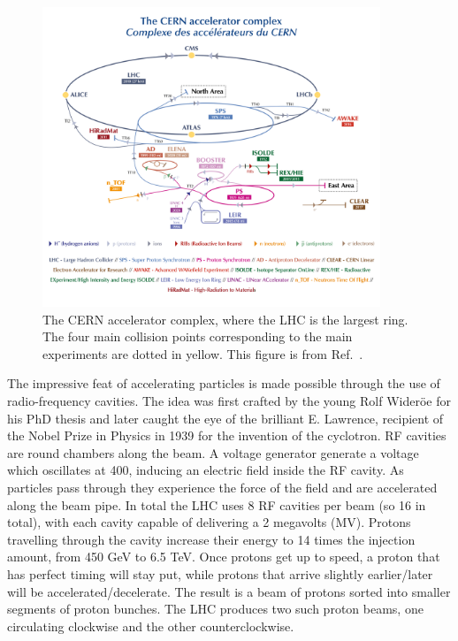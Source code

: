 \begin{figure}
  \includegraphics[width=0.9\textwidth]{Figures/LHC/CernAcceleratorComplex.png}
  \caption[The \CERN accelerator complex]%
  {The CERN accelerator complex, where the LHC is the largest ring. The four main collision points corresponding to the main experiments are dotted in yellow. This figure is from Ref.~\cite{Mobs:2684277}.}
  \label{fig:CERNComplex}
\end{figure}

The impressive feat of accelerating particles is made possible through the use of radio-frequency cavities. The idea was first crafted by the young Rolf Wideröe \cite{vretenar2012radio} for his PhD thesis and later caught the eye of the brilliant E. Lawrence, recipient of the Nobel Prize in Physics in 1939 for the invention of the cyclotron. RF cavities are round chambers along the beam. A voltage generator generate a voltage which oscillates at \unit{400}{\mega\hertz}, inducing an electric field inside the RF cavity. As particles pass through they experience the force of the field and are accelerated along the beam pipe. In total the LHC uses 8 RF cavities per beam (so 16 in total), with each cavity capable of delivering a 2 megavolts (MV). Protons travelling through the cavity increase their energy to 14 times the injection amount, from 450 GeV to 6.5 TeV. Once protons get up to speed, a proton that has perfect timing will stay put, while protons that arrive slightly earlier/later will be accelerated/decelerate. The result is a beam of protons sorted into smaller segments of proton bunches. The LHC produces two such proton beams, one circulating clockwise and the other counterclockwise. 

